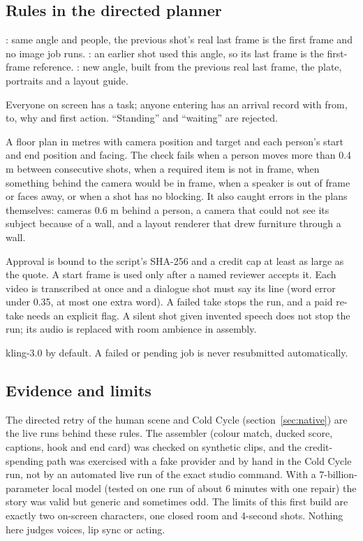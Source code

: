 \documentclass[11pt,a4paper]{article}
\newcommand{\code}[1]{\texttt{\detokenize{#1}}}
\begin{document}
\subsection{Rules in the directed planner}
\begin{description}[leftmargin=0.6cm]
\item[Chained first frames.] \code{continue}: same angle and people, the previous shot's real last frame is the first frame and no image job runs. \code{resume}: an earlier shot used this angle, so its last frame is the first-frame reference. \code{build}: new angle, built from the previous real last frame, the plate, portraits and a layout guide.
\item[Motivated action.] Everyone on screen has a task; anyone entering has an arrival record with from, to, why and first action. ``Standing'' and ``waiting'' are rejected.
\item[Blocking check.] A floor plan in metres with camera position and target and each person's start and end position and facing. The check fails when a person moves more than 0.4 m between consecutive shots, when a required item is not in frame, when something behind the camera would be in frame, when a speaker is out of frame or faces away, or when a shot has no blocking. It also caught errors in the plans themselves: cameras 0.6 m behind a person, a camera that could not see its subject because of a wall, and a layout renderer that drew furniture through a wall.
\item[Approval binding.] Approval is bound to the script's SHA-256 and a credit cap at least as large as the quote. A start frame is used only after a named reviewer accepts it. Each video is transcribed at once and a dialogue shot must say its line (word error under 0.35, at most one extra word). A failed take stops the run, and a paid re-take needs an explicit flag. A silent shot given invented speech does not stop the run; its audio is replaced with room ambience in assembly.
\item[Provider.] kling-3.0 by default. A failed or pending job is never resubmitted automatically.
\end{description}

\subsection{Evidence and limits}
The directed retry of the human scene and Cold Cycle (section~\ref{sec:native}) are the live runs behind these rules. The assembler (colour match, ducked score, captions, hook and end card) was checked on synthetic clips, and the credit-spending path was exercised with a fake provider and by hand in the Cold Cycle run, not by an automated live run of the exact studio command. With a 7-billion-parameter local model (tested on one run of about 6 minutes with one repair) the story was valid but generic and sometimes odd. The limits of this first build are exactly two on-screen characters, one closed room and 4-second shots. Nothing here judges voices, lip sync or acting.
\end{document}
